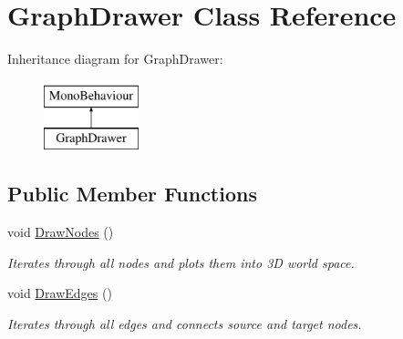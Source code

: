 \hypertarget{class_graph_drawer}{}\section{Graph\+Drawer Class Reference}
\label{class_graph_drawer}
Inheritance diagram for Graph\+Drawer\+:\begin{figure}[H]
\begin{center}
\leavevmode
\includegraphics[height=2.000000cm]{class_graph_drawer}
\end{center}
\end{figure}
\subsection*{Public Member Functions}
\begin{DoxyCompactItemize}
\item 
void \mbox{\hyperlink{class_graph_drawer_a3aabb356d594c77af566191bc7869eff}{Draw\+Nodes}} ()
\begin{DoxyCompactList}\small\item\em Iterates through all nodes and plots them into 3D world space. \end{DoxyCompactList}\item 
void \mbox{\hyperlink{class_graph_drawer_ad4bde4b9d817629c77bc1e8818e5cd69}{Draw\+Edges}} ()
\begin{DoxyCompactList}\small\item\em Iterates through all edges and connects source and target nodes. \end{DoxyCompactList}\end{DoxyCompactItemize}
